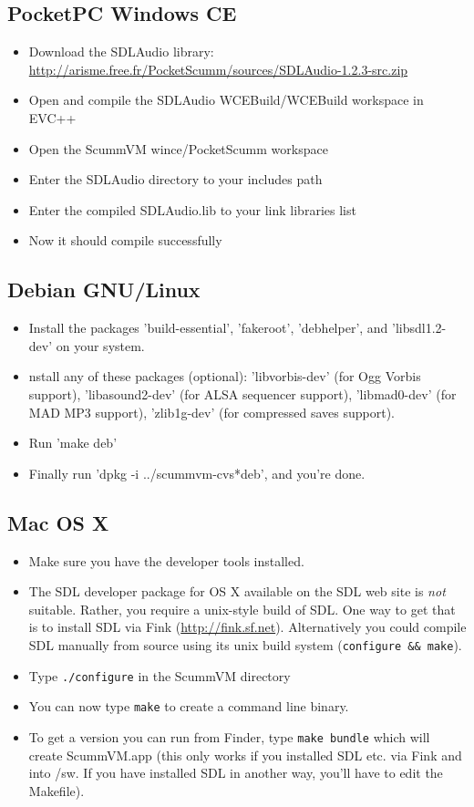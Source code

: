\subsection{PocketPC Windows CE}
  \begin{itemize}
  \item Download the SDLAudio library:\\
    \url{http://arisme.free.fr/PocketScumm/sources/SDLAudio-1.2.3-src.zip}
  \item Open and compile the SDLAudio WCEBuild/WCEBuild workspace in
    EVC++
  \item Open the ScummVM wince/PocketScumm workspace
  \item Enter the SDLAudio directory to your includes path
  \item Enter the compiled SDLAudio.lib to your link libraries list
  \item Now it should compile successfully
  \end{itemize}
\subsection{Debian GNU/Linux}
  \begin{itemize}
  \item Install the packages 'build-essential', 'fakeroot', 'debhelper',
          and 'libsdl1.2-dev' on your system.
  \item nstall any of these packages (optional): 'libvorbis-dev' (for Ogg
          Vorbis support), 'libasound2-dev' (for ALSA sequencer support),
          'libmad0-dev' (for MAD MP3 support), 'zlib1g-dev' (for compressed
          saves support).
  \item Run 'make deb'
  \item Finally run 'dpkg -i ../scummvm-cvs*deb', and you're done.
  \end{itemize}
\subsection{Mac OS X}
\begin{itemize}
\item Make sure you have the developer tools installed.
\item The SDL developer package for OS X available on the SDL web site is
      \textit{not} suitable. Rather, you require a unix-style build of SDL. One
      way to get that is to install SDL via Fink (\url{http://fink.sf.net}).
      Alternatively you could compile SDL manually from source using its
      unix build system (\texttt{configure \&\& make}).
\item Type \texttt{./configure} in the ScummVM directory
\item You can now type \texttt{make} to create a command line binary.
\item To get a version you can run from Finder, type \texttt{make bundle} which
      will create ScummVM.app (this only works if you installed SDL
      etc. via Fink and into /sw. If you have installed SDL in another
      way, you'll have to edit the Makefile).
\end{itemize}
